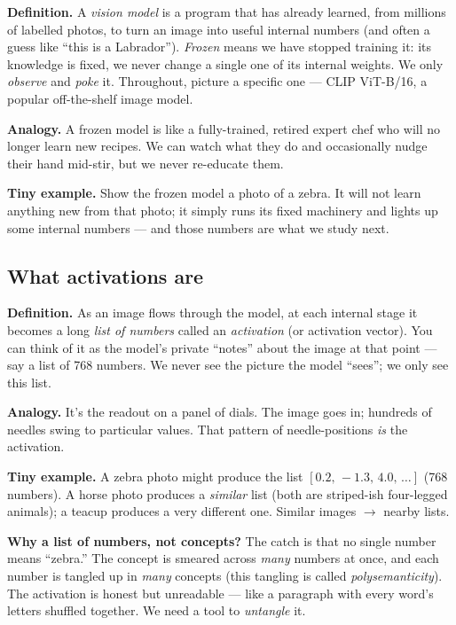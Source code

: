 \documentclass[12pt]{article}
\newcommand{\dlabel}[1]{\textbf{\textcolor{accent}{#1}}\;}
\begin{document}
\dlabel{Definition.} A \emph{vision model} is a program that has already learned, from millions of labelled photos, to turn an image into useful internal numbers (and often a guess like ``this is a Labrador''). \emph{Frozen} means we have stopped training it: its knowledge is fixed, we never change a single one of its internal weights. We only \emph{observe} and \emph{poke} it. Throughout, picture a specific one --- CLIP ViT-B/16, a popular off-the-shelf image model.

\dlabel{Analogy.} A frozen model is like a fully-trained, retired expert chef who will no longer learn new recipes. We can watch what they do and occasionally nudge their hand mid-stir, but we never re-educate them.

\dlabel{Tiny example.} Show the frozen model a photo of a zebra. It will not learn anything new from that photo; it simply runs its fixed machinery and lights up some internal numbers --- and those numbers are what we study next.

\subsection{What activations are}

\dlabel{Definition.} As an image flows through the model, at each internal stage it becomes a long \emph{list of numbers} called an \emph{activation} (or activation vector). You can think of it as the model's private ``notes'' about the image at that point --- say a list of 768 numbers. We never see the picture the model ``sees''; we only see this list.

\dlabel{Analogy.} It's the readout on a panel of dials. The image goes in; hundreds of needles swing to particular values. That pattern of needle-positions \emph{is} the activation.

\dlabel{Tiny example.} A zebra photo might produce the list $[0.2,\,-1.3,\,4.0,\,\dots]$ (768 numbers). A horse photo produces a \emph{similar} list (both are striped-ish four-legged animals); a teacup produces a very different one. Similar images $\to$ nearby lists.

\begin{keybox}
\textbf{Why a list of numbers, not concepts?} The catch is that no single number means ``zebra.'' The concept is smeared across \emph{many} numbers at once, and each number is tangled up in \emph{many} concepts (this tangling is called \emph{polysemanticity}). The activation is honest but unreadable --- like a paragraph with every word's letters shuffled together. We need a tool to \emph{untangle} it.
\end{keybox}
\end{document}

